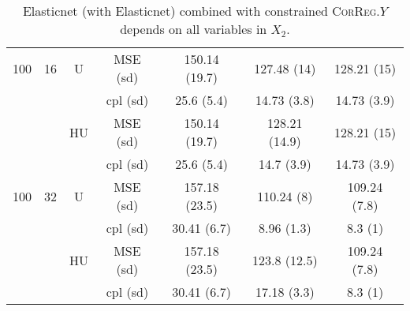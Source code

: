 \documentclass[11pt,a4paper]{article}
\begin{document}
\begin{table}[h!]
\begin{tabular}{|c|c|c|c|c|c|c|}
\hline
\hline %
100 & 16 & U& MSE (sd) & 150.14 (19.7) & 127.48 (14) & 128.21 (15) \\
& & &  cpl (sd) & 25.6 (5.4) & 14.73 (3.8) & 14.73 (3.9) \\
 &  &HU &  MSE (sd) & 150.14 (19.7) & 128.21 (14.9) & 128.21 (15) \\
& & & cpl (sd) & 25.6 (5.4) & 14.7 (3.9) & 14.73 (3.9) \\
\hline %
100 & 32 & U& MSE (sd) & 157.18 (23.5) & 110.24 (8) & 109.24 (7.8) \\
& & &  cpl (sd) & 30.41 (6.7) & 8.96 (1.3) & 8.3 (1) \\
 &  &HU &  MSE (sd) & 157.18 (23.5) & 123.8 (12.5) & 109.24 (7.8) \\
& & & cpl (sd) & 30.41 (6.7) & 17.18 (3.3) & 8.3 (1) \\
\hline
\end{tabular} 
\caption{Elasticnet (with Elasticnet) combined with constrained \textsc{CorReg}.$Y$  depends on all variables in $X_2$.}\label{YX2linenet}
\end{table}
\end{document}
